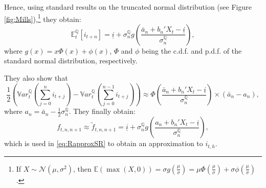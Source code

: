 \documentclass[
  12pt,
]{book}
\theoremstyle{definition}
\theoremstyle{definition}
\theoremstyle{definition}
\theoremstyle{definition}
\theoremstyle{remark}
\begin{document}
Hence, using standard results on the truncated normal distribution (see Figure \ref{fig:Mills}),\footnote{If \(X\sim \mathcal{N}(\mu,\sigma^2)\), then \(\mathbb{E}(\max(X,0))=\sigma g\left(\frac{\mu}{\sigma}\right)= \mu\Phi\left(\frac{\mu}{\sigma}\right)+\sigma\phi\left(\frac{\mu}{\sigma}\right)\).} they obtain:
\[
\mathbb{E}_t^{\mathbb{Q}}[i_{t+n}] = \underline{i} + \sigma_n^{\mathbb{Q}}g\left(\frac{\bar{a}_n + b_n'X_t - \underline{i}}{\sigma_n^{\mathbb{Q}}}\right),
\]
where \(g(x)= x\Phi(x)+\phi(x)\), \(\Phi\) and \(\phi\) being the c.d.f. and p.d.f. of the standard normal distribution, respectively.

They also show that
\[
\frac{1}{2}\left(\mathbb{V}ar_t^{\mathbb{Q}}\left(\sum_{j=0}^n i_{t+j}\right)-\mathbb{V}ar_t^{\mathbb{Q}}\left(\sum_{j=0}^{n-1} i_{t+j}\right)\right) \approx \Phi\left(\frac{\bar{a}_n + b_n'X_t - \underline{i}}{\sigma_n^{\mathbb{Q}}}\right)\times(\bar{a}_n - a_n),
\]
where \(a_n = \bar{a}_n - \frac{1}{2}\sigma_n^{\mathbb{Q}}\). They finally obtain:
\[
\boxed{f_{t,n,n+1} \approx \tilde{f}_{t,n,n+1} = \underline{i} + \sigma_n^{\mathbb{Q}}g\left(\frac{a_n + b_n'X_t - \underline{i}}{\sigma_n^{\mathbb{Q}}}\right),}
\]
which is used in \eqref{eq:RapproxSR} to obtain an approximation to \(i_{t,h}\).
\end{document}
